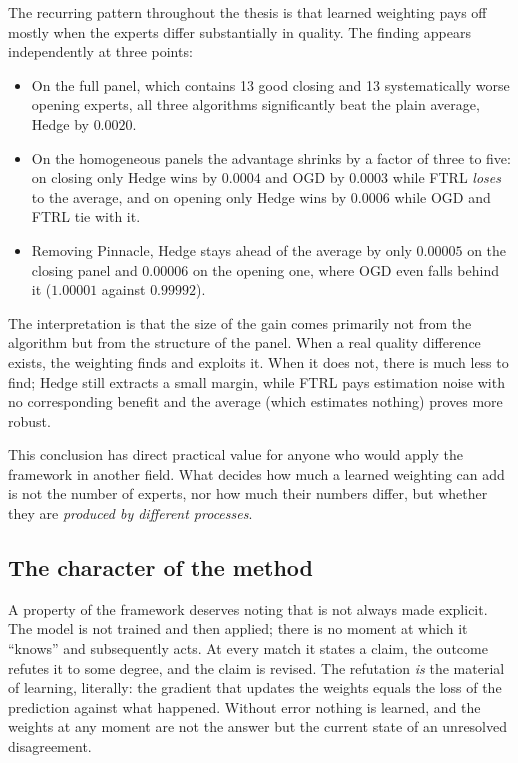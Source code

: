 \documentclass[12pt,a4paper,oneside]{report}
\renewcommand{\_}{\oldunderscore\allowbreak}
\theoremstyle{definition}
\theoremstyle{plain}
\theoremstyle{definition}   %
\begin{document}
The recurring pattern throughout the thesis is that learned weighting pays off mostly when the
experts differ substantially in quality. The finding appears independently at three points:

\begin{itemize}
  \item On the full panel, which contains 13 good closing and 13 systematically worse opening
        experts, all three algorithms significantly beat the plain average, Hedge by $0.0020$.
  \item On the homogeneous panels the advantage shrinks by a factor of three to five: on closing
        only Hedge wins by $0.0004$ and OGD by $0.0003$ while FTRL \emph{loses} to the average,
        and on opening only Hedge wins by $0.0006$ while OGD and FTRL tie with it.
  \item Removing Pinnacle, Hedge stays ahead of the average by only $0.00005$ on the closing
        panel and $0.00006$ on the opening one, where OGD even falls behind it ($1.00001$ against
        $0.99992$).
\end{itemize}

The interpretation is that the size of the gain comes primarily not from the algorithm but from
the structure of the panel. When a real quality difference exists, the weighting finds and
exploits it. When it does not, there is much less to find; Hedge still extracts a small margin,
while FTRL pays estimation noise with no corresponding benefit and the average (which estimates
nothing) proves more robust.

This conclusion has direct practical value for anyone who would apply the framework in another
field. What decides how much a learned weighting can add is not the number of experts, nor how
much their numbers differ, but whether they are \emph{produced by different processes}.

\subsection{The character of the method}

A property of the framework deserves noting that is not always made explicit. The model is not
trained and then applied; there is no moment at which it ``knows'' and subsequently acts. At every
match it states a claim, the outcome refutes it to some degree, and the claim is revised. The
refutation \emph{is} the material of learning, literally: the gradient that updates the weights
equals the loss of the prediction against what happened. Without error nothing is learned, and the
weights at any moment are not the answer but the current state of an unresolved disagreement.
\end{document}

